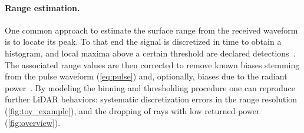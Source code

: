 \paragraph{Range estimation.}

One common approach to estimate the surface range from the received waveform is to locate its peak. To that end the signal is discretized in time to obtain a histogram, and local maxima above a certain threshold are declared detections~\cite{winiwarter2022virtual}. The associated range values are then corrected to remove known biases stemming from the pulse waveform (\cf \cref{eq:pulse}) and, optionally, biases due to the radiant power~\cite{winiwarter2022virtual}.
By modeling the binning and thresholding procedure one can reproduce further LiDAR  behaviors: systematic discretization errors in the range resolution (\cf \cref{fig:toy_example}), and the dropping of rays with low returned power (\cf \cref{fig:overview}).


